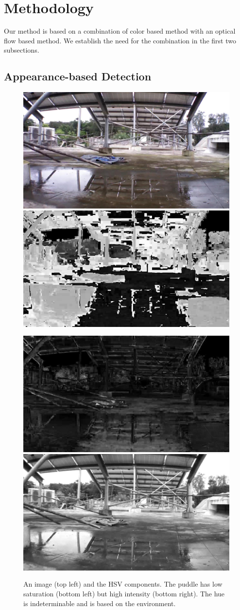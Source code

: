 \section{Methodology}  Our method is based on a combination of color
based method with an optical flow based method.  We establish the
need for the combination in the first two subsections.

\subsection{Appearance-based Detection }

\begin{figure}[h!]
  \centering
  \includegraphics[width=0.4\linewidth]{figures/stagnantWater/IMG_PAIR_27_1.jpg} \hfill
  \includegraphics[width=0.4\linewidth]{figures/stagnantWater/IMG_PAIR_27_1_H.jpg} 

  \includegraphics[width=0.4\linewidth]{figures/stagnantWater/IMG_PAIR_27_1_S.jpg} \hfill
  \includegraphics[width=0.4\linewidth]{figures/stagnantWater/IMG_PAIR_27_1_V.jpg}
  \caption[HSV Components]{An image (top left) and the HSV components.  The
  puddle has low saturation (bottom left) but high intensity (bottom right).
    The hue is indeterminable and is based on the environment.}
  \label{fig:HSV}
\end{figure}

